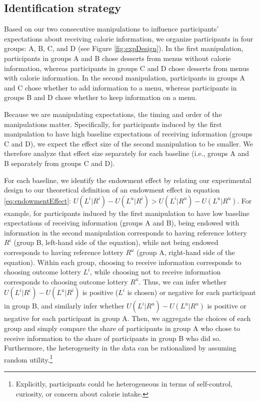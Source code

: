\documentclass[12pt]{article}
\begin{document}
\subsection{Identification strategy}

Based on our two consecutive manipulations to influence participants’ expectations about receiving calorie information, we organize participants in four groups: A, B, C, and D (see Figure \ref{fig:expDesign}). In the first manipulation, participants in groups A and B chose desserts from menus without calorie information, whereas participants in groups C and D chose desserts from menus with calorie information. In the second manipulation, participants in groups A and C chose whether to add information to a menu, whereas participants in groups B and D chose whether to keep information on a menu.

Because we are manipulating expectations, the timing and order of the manipulations matter. Specifically, for participants induced by the first manipulation to have high baseline expectations of receiving information (groups C and D), we expect the effect size of the second manipulation to be smaller. We therefore analyze that effect size separately for each baseline (i.e., groups A and B separately from groups C and D).

For each baseline, we identify the endowment effect by relating our experimental design to our theoretical definition of an endowment effect in equation \ref{eq:endowmentEffect}: $U(L^i|R^i)-U(L^u|R^i)>U(L^i|R^u)-U(L^u|R^u)$. For example, for participants induced by the first manipulation to have low baseline expectations of receiving information (groups A and B), being endowed with information in the second manipulation corresponds to having reference lottery $R^i$ (group B, left-hand side of the equation), while not being endowed corresponds to having reference lottery $R^u$ (group A, right-hand side of the equation). Within each group, choosing to receive information corresponds to choosing outcome lottery $L^i$, while choosing not to receive information corresponds to choosing outcome lottery $R^u$. Thus, we can infer whether $U(L^i|R^i)-U(L^u|R^i)$ is positive ($L^i$ is chosen) or negative for each participant in group B, and similarly infer whether $U(L^i|R^u)-U(L^u|R^u)$ is positive or negative for each participant in group A. Then, we aggregate the choices of each group and simply compare the share of participants in group A who chose to receive information to the share of participants in group B who did so. Furthermore, the heterogeneity in the data can be rationalized by assuming random utility.\footnote{Explicitly, participants could be heterogeneous in terms of self-control, curiosity, or concern about calorie intake.}
\end{document}
